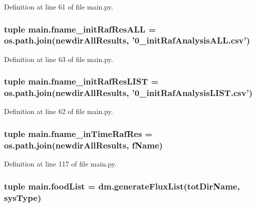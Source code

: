 Definition at line 61 of file main.\-py.

\hypertarget{a00151_a1b43b3b737d94a412b2334b78252cdef}{
\subsubsection[{fname\-\_\-init\-Raf\-Res\-A\-L\-L}]{\setlength{\rightskip}{0pt plus 5cm}tuple main.\-fname\-\_\-init\-Raf\-Res\-A\-L\-L = os.\-path.\-join({\bf newdir\-All\-Results}, '0\-\_\-init\-Raf\-Analysis\-A\-L\-L.\-csv')}}\label{a00151_a1b43b3b737d94a412b2334b78252cdef}


Definition at line 63 of file main.\-py.

\hypertarget{a00151_adf05ced8171427a0ea7daf7e595f72b6}{
\subsubsection[{fname\-\_\-init\-Raf\-Res\-L\-I\-S\-T}]{\setlength{\rightskip}{0pt plus 5cm}tuple main.\-fname\-\_\-init\-Raf\-Res\-L\-I\-S\-T = os.\-path.\-join({\bf newdir\-All\-Results}, '0\-\_\-init\-Raf\-Analysis\-L\-I\-S\-T.\-csv')}}\label{a00151_adf05ced8171427a0ea7daf7e595f72b6}


Definition at line 62 of file main.\-py.

\hypertarget{a00151_a64d742d069748ddd43a9378ef918d0b1}{
\subsubsection[{fname\-\_\-in\-Time\-Raf\-Res}]{\setlength{\rightskip}{0pt plus 5cm}tuple main.\-fname\-\_\-in\-Time\-Raf\-Res = os.\-path.\-join({\bf newdir\-All\-Results}, {\bf f\-Name})}}\label{a00151_a64d742d069748ddd43a9378ef918d0b1}


Definition at line 117 of file main.\-py.

\hypertarget{a00151_a07ce1f0750b6dc5baff89792fc194152}{
\subsubsection[{food\-List}]{\setlength{\rightskip}{0pt plus 5cm}tuple main.\-food\-List = dm.\-generate\-Flux\-List({\bf tot\-Dir\-Name}, sys\-Type)}}\label{a00151_a07ce1f0750b6dc5baff89792fc194152}


